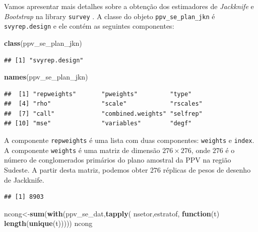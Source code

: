 \documentclass[]{book}
\newenvironment{Shaded}{\begin{snugshade}}{\end{snugshade}}
\newcommand{\KeywordTok}[1]{\textcolor[rgb]{0.13,0.29,0.53}{\textbf{#1}}}
\newcommand{\ControlFlowTok}[1]{\textcolor[rgb]{0.13,0.29,0.53}{\textbf{#1}}}
\newcommand{\OperatorTok}[1]{\textcolor[rgb]{0.81,0.36,0.00}{\textbf{#1}}}
\newcommand{\NormalTok}[1]{#1}
\theoremstyle{definition}
\theoremstyle{definition}
\theoremstyle{definition}
\theoremstyle{remark}
\begin{document}
Vamos apresentar mais detalhes sobre a obtenção dos estimadores de
\emph{Jackknife} e \emph{Bootstrap} na library \texttt{survey}
\citep{R-survey}. A classe do objeto \texttt{ppv\_se\_plan\_jkn} é
\texttt{svyrep.design} e ele contém as seguintes componentes:

\begin{Shaded}
\begin{Highlighting}[]
\KeywordTok{class}\NormalTok{(ppv_se_plan_jkn)}
\end{Highlighting}
\end{Shaded}

\begin{verbatim}
## [1] "svyrep.design"
\end{verbatim}

\begin{Shaded}
\begin{Highlighting}[]
\KeywordTok{names}\NormalTok{(ppv_se_plan_jkn)}
\end{Highlighting}
\end{Shaded}

\begin{verbatim}
##  [1] "repweights"       "pweights"         "type"            
##  [4] "rho"              "scale"            "rscales"         
##  [7] "call"             "combined.weights" "selfrep"         
## [10] "mse"              "variables"        "degf"
\end{verbatim}

A componente \texttt{repweights} é uma lista com duas componentes:
\texttt{weights} e \texttt{index}. A componente \texttt{weights} é uma
matriz de dimensão \(276 \times 276\), onde \(276\) é o número de
conglomerados primários do plano amostral da PPV na região Sudeste. A
partir desta matriz, podemos obter \(276\) réplicas de pesos de desenho
de Jackknife.

\begin{Shaded}
\end{Shaded}

\begin{verbatim}
## [1] 8903
\end{verbatim}

\begin{Shaded}
\begin{Highlighting}[]
\NormalTok{ncong<-}\KeywordTok{sum}\NormalTok{(}\KeywordTok{with}\NormalTok{(ppv_se_dat,}\KeywordTok{tapply}\NormalTok{( nsetor,estratof, }\ControlFlowTok{function}\NormalTok{(t) }\KeywordTok{length}\NormalTok{(}\KeywordTok{unique}\NormalTok{(t)))))}
\NormalTok{ncong}
\end{Highlighting}
\end{Shaded}
\end{document}
